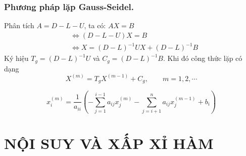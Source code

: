 \documentclass[12pt, a4paper]{report}
\begin{document}
\subsection{Phương pháp lặp Gauss-Seidel.}
Phân tích $A=D-L-U$, ta có: $AX = B$
\[
    \begin{aligned}
        & \Leftrightarrow (D-L-U)X = B \\
        & \Leftrightarrow X = (D-L)^{-1}UX + (D-L)^{-1}B
    \end{aligned}
\]
Ký hiệu $T_g = (D-L)^{-1}U$ và $C_g = (D-L)^{-1}B$. Khi đó công thức lặp có dạng
\[
    X^{(m)} = T_g X^{(m-1)} + C_g, \qquad m = 1,2,\cdots    
\]
\begin{tcolorbox}[title=Dạng tường minh của công thức lặp Gauss-Seidel, titlebox=visible, colframe=blue!75!black,colback=blue!5!white,fonttitle=\bfseries]
    \[
        x^{(m)}_i = \dfrac{1}{a_{ii}} \left(  -\displaystyle \sum_{j=1}^{i-1}a_{ij}x^{(m)}_j - \displaystyle \sum_{j=i+1}^{n}a_{ij}x^{(m-1)}_j + b_i \right)
    \]
\end{tcolorbox}
\newpage
\chapter{NỘI SUY VÀ XẤP XỈ HÀM}
\end{document}
